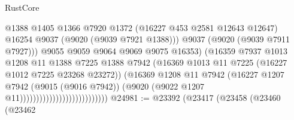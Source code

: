\begin{lexlean}{RustCore}
\begin{coremodule}
                                                      @1388
                                                      @1405
                                                      @1366
                                                      @7920
                                                      @1372
                                                      (@16227 @453 @2581 @12643 @12647)
                                                      @16254
                                                      @9037
                                                      (@9020 (@9039 @7921 @1388)))
                                                    @9037
                                                    (@9020 (@9039 @7911 @7927)))
                                                  @9055
                                                  @9059
                                                  @9064
                                                  @9069
                                                  @9075
                                                  @16353)
                                                (@16359
                                                  @7937
                                                  @1013
                                                  @1208
                                                  @11
                                                  @1388
                                                  @7225
                                                  @1388
                                                  @7942
                                                  (@16369
                                                    @1013
                                                    @11
                                                    @7225
                                                    (@16227 @1012 @7225 @23268 @23272))
                                                  (@16369
                                                    @1208
                                                    @11
                                                    @7942
                                                    (@16227
                                                      @1207
                                                      @7942
                                                      (@9015 (@9016 @7942))
                                                      (@9020
                                                        (@9022 @1207 @11)))))))))))))))))))))))))))
@24981 := @23392
    (@23417
      (@23458
        (@23460
          (@23462

\end{coremodule}
\end{lexlean}
